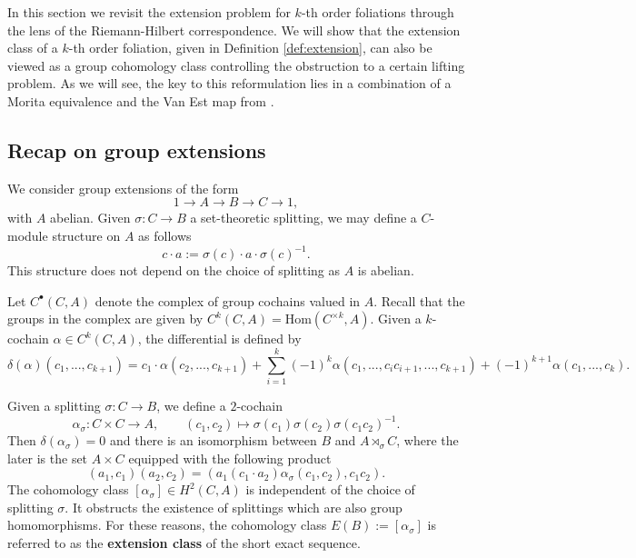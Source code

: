 \documentclass[10pt]{amsart}
\numberwithin{theoremalpha}{section}
\numberwithin{equation}{section}
\numberwithin{definition}{section}
\numberwithin{theorem}{section}
\numberwithin{proposition}{section}
\numberwithin{lemma}{section}
\numberwithin{example}{section}
\numberwithin{remark}{section}
\numberwithin{corollary}{section}
\numberwithin{question}{section}
\numberwithin{problem}{section}
\numberwithin{assumption}{section}
\theoremstyle{named}
\numberwithin{equation}{section}
\begin{document}
In this section we revisit the extension problem for $k$-th order foliations through the lens of the Riemann-Hilbert correspondence. We will show that the extension class of a $k$-th order foliation, given in Definition \ref{def:extension}, can also be viewed as a group cohomology class controlling the obstruction to a certain lifting problem. As we will see, the key to this reformulation lies in a combination of a Morita equivalence and the Van Est map from \cite{MR1103911}. 

\subsection{Recap on group extensions}
We consider group extensions of the form
\begin{equation*}
1 \rightarrow A \rightarrow B \rightarrow C \rightarrow 1,
\end{equation*}
with $A$ abelian. Given $\sigma : C \rightarrow B$ a set-theoretic splitting, we may define a $C$-module structure on $A$ as follows
\begin{equation*}
c\cdot a := \sigma(c)\cdot a\cdot \sigma(c)^{-1}. 
\end{equation*}
This structure does not depend on the choice of splitting as $A$ is abelian. 

Let $C^{\bullet}(C,A)$ denote the complex of group cochains valued in $A$. Recall that the groups in the complex are given by $C^{k}(C, A) = \mathrm{Hom}(C^{\times k}, A)$. Given a $k$-cochain $\alpha \in C^{k}(C,A)$, the differential is defined by 
\[
\delta(\alpha)(c_{1}, ..., c_{k+1}) = c_{1} \cdot \alpha(c_{2}, ..., c_{k+1}) + \sum_{i = 1}^{k} (-1)^{k} \alpha(c_{1}, ..., c_{i} c_{i+1}, ..., c_{k+1}) + (-1)^{k+1} \alpha(c_{1}, ..., c_{k}). 
\]

Given a splitting $\sigma : C \rightarrow B$, we define a $2$-cochain 
\[
\alpha_{\sigma}: C \times C \to A, \qquad (c_{1}, c_{2}) \mapsto \sigma(c_{1}) \sigma(c_{2}) \sigma(c_1 c_2)^{-1}.
\]
Then $\delta(\alpha_{\sigma}) = 0$ and there is an isomorphism between $B$ and $A \rtimes_{\sigma} C$, where the later is the set $A \times C$ equipped with the following product 
\[
(a_1, c_1) (a_2, c_2) = (a_1 (c_1 \cdot a_2) \alpha_{\sigma}(c_1,c_2), c_1 c_2). 
\]
The cohomology class $[\alpha_{\sigma}] \in H^2(C,A)$ is independent of the choice of splitting $\sigma$. It obstructs the existence of splittings which are also group homomorphisms. For these reasons, the cohomology class $E(B) := [\alpha_{\sigma}]$ is referred to as the \textbf{extension class} of the short exact sequence. 
\end{document}
